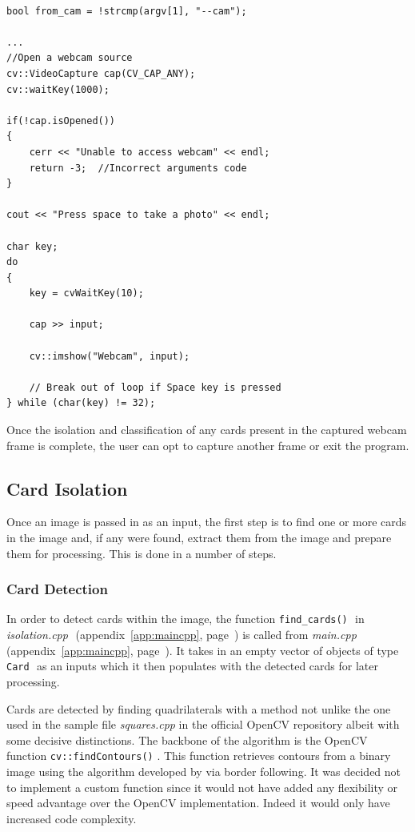 \documentclass[a4paper,12pt,notitlepage]{article}
\newcommand{\source}[2]{\emph{#1 } (appendix~\ref{#2}, page~\pageref{#2})}
\newcommand{\code}[1]{\colorbox{white}{\lstinline[basicstyle=\ttfamily\color{black}]|#1|} }
\begin{document}
		\begin{lstlisting}

bool from_cam = !strcmp(argv[1], "--cam");

...
//Open a webcam source
cv::VideoCapture cap(CV_CAP_ANY);
cv::waitKey(1000);

if(!cap.isOpened())
{
    cerr << "Unable to access webcam" << endl;
    return -3;  //Incorrect arguments code
}

cout << "Press space to take a photo" << endl;

char key;
do
{
    key = cvWaitKey(10);

    cap >> input;

    cv::imshow("Webcam", input);

    // Break out of loop if Space key is pressed
} while (char(key) != 32);
		\end{lstlisting}

		Once the isolation and classification of any cards present in the captured webcam frame is complete, the user can opt to capture another frame or exit the program.



	\subsection{Card Isolation}

		Once an image is passed in as an input, the first step is to find one or more cards in the image and, if any were found, extract them from the image and prepare them for processing. This is done in a number of steps.

		\subsubsection{Card Detection}

			In order to detect cards within the image, the function \code{find_cards()} in \source{isolation.cpp}{app:maincpp} is called from \source{main.cpp}{app:maincpp}. It takes in an empty vector of objects of type \code{Card} as an inputs which it then populates with the detected cards for later processing.

			Cards are detected by finding quadrilaterals with a method not unlike the one used in the sample file \emph{squares.cpp} in the official OpenCV repository \autocite{squares} albeit with some decisive distinctions. The backbone of the algorithm is the OpenCV function \code{cv::findContours()}. This function retrieves contours from a binary image using the algorithm developed by \textcite{suzuki1985topological} via border following. It was decided not to implement a custom function since it would not have added any flexibility or speed advantage over the OpenCV implementation. Indeed it would only have increased code complexity.
\end{document}
